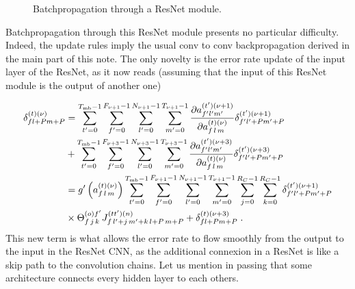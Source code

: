 \begin{subappendices}
\begin{figure}[H]
\begin{center}
\caption{Batchpropagation through a ResNet module.}
\end{center}
\end{figure}

Batchpropagation through this ResNet module presents no particular difficulty. Indeed, the update rules imply the usual conv to conv backpropagation derived in the main part of this note. The only novelty is the error rate update of the input layer of the ResNet, as it now reads (assuming that the input of  this ResNet module is the output of another one)

\begin{align}
\delta^{(t)(\nu)}_{fl+Pm+P}&=
%
\sum_{t'=0}^{T_{{\rm mb}}-1}\sum^{F_{\nu+1}-1}_{f'=0}\sum^{N_{\nu+1}-1}_{l'=0}\sum^{T_{\nu+1}-1}_{m'=0}
%
\frac{\partial a_{f'l'm'}^{(t')(\nu+1)}}{\partial a_{f\,l\,m}^{(t)(\nu)}}
%
\delta_{f'l'+Pm'+P}^{(t')(\nu+1)}\notag\\
%
&+\sum_{t'=0}^{T_{{\rm mb}}-1}\sum^{F_{\nu+3}-1}_{f'=0}\sum^{N_{\nu+3}-1}_{l'=0}\sum^{T_{\nu+3}-1}_{m'=0}
%
\frac{\partial a_{f'l'm'}^{(t')(\nu+3)}}{\partial a_{f\,l\,m}^{(t)(\nu)}}
%
\delta_{f'l'+Pm'+P}^{(t')(\nu+3)}\notag\\
%
&=g'\left(a_{f\,l\,m}^{(t)(\nu)}\right)
%
\sum_{t'=0}^{T_{{\rm mb}}-1}\sum^{F_{\nu+1}-1}_{f'=0}\sum^{N_{\nu+1}-1}_{l'=0}\sum^{T_{\nu+1}-1}_{m'=0}
%
\sum^{R_C-1}_{j=0}\sum^{R_C-1}_{k=0}\delta_{f'l'+Pm'+P}^{(t')(\nu+1)}\notag\\
%
&\times \Theta^{(o)f'}_{f\,j\,k} J^{(tt')(n)}_{f\, l'+j\,m'+k\,l+P\,m+P}
%
+\delta_{fl+Pm+P}^{(t)(\nu+3)}\;.
\end{align}
This new term is what allows the error rate to flow smoothly from the output to the input in the ResNet CNN, as the additional connexion in a ResNet is like a skip path to the convolution chains. Let us mention in passing that some architecture connects every hidden layer to each others\cite{HuangGLZLW}.



\end{subappendices}
